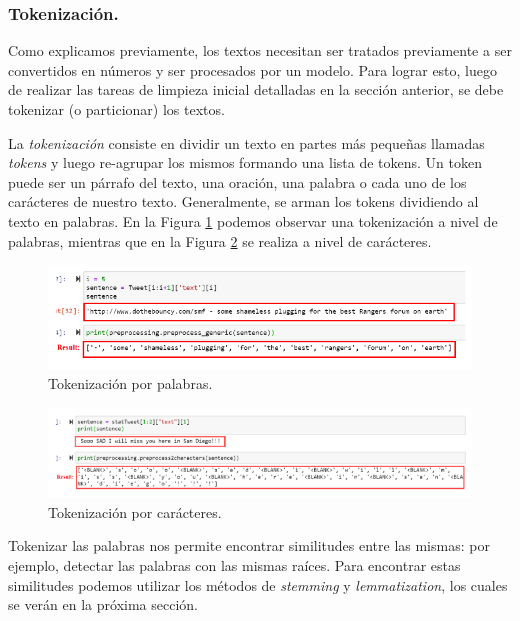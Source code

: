 \documentclass[12pt,a4paper]{article}
\begin{document}
\begin{sloppypar}
\begin{enumerate}
\end{enumerate}

\cleardoublepage

\subsubsection{Tokenización.}\label{tokenizacion}

Como explicamos previamente, los textos necesitan ser tratados previamente a ser convertidos en números y ser procesados por un modelo. Para lograr esto, luego de realizar las tareas de limpieza inicial detalladas en la sección anterior, se debe tokenizar (o particionar) los textos. 

La \textit{tokenización} consiste en dividir un texto en partes más pequeñas llamadas \textit{tokens} y luego re-agrupar los mismos formando una lista de tokens. Un token puede ser un párrafo del texto, una oración, una palabra o cada uno de los carácteres de nuestro texto. Generalmente, se arman los tokens dividiendo al texto en palabras. En la Figura \ref{fig:Imagen_NLP_2} podemos observar una tokenización a nivel de palabras, mientras que en la Figura \ref{fig:Imagen_NLP_3} se realiza a nivel de carácteres. 

\begin{figure}[H]    
 \centering
 \includegraphics[width=1\textwidth]{images/NLP/2.png}
 \caption{Tokenización por palabras\cite{NLP_2}.}
 \label{fig:Imagen_NLP_2}
\end{figure}

\begin{figure}[H]    
 \centering
 \includegraphics[width=1\textwidth]{images/NLP/3.png}
 \caption{Tokenización por carácteres\cite{NLP_2}.}
 \label{fig:Imagen_NLP_3}
\end{figure}

Tokenizar las palabras nos permite encontrar similitudes entre las mismas: por ejemplo, detectar las palabras con las mismas raíces. Para encontrar estas similitudes podemos utilizar los métodos de \textit{stemming} y \textit{lemmatization}, los cuales se verán en la próxima sección.


\end{sloppypar}
\end{document}
